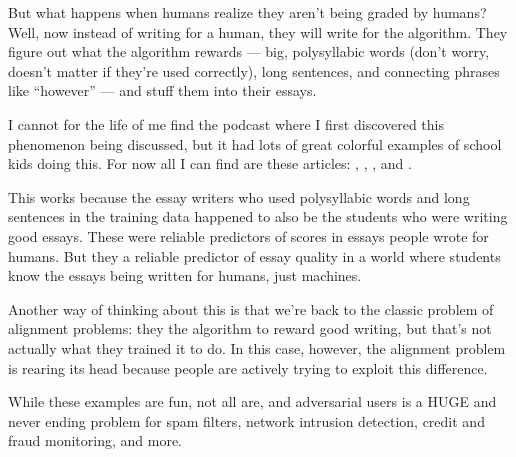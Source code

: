 \documentclass[letterpaper,10pt,english]{jupyterBook}
\begin{document}
\sphinxAtStartPar
But what happens when humans realize they aren’t being graded by humans? Well, now instead of writing for a human, they will write for the algorithm. They figure out what the algorithm rewards — big, polysyllabic words (don’t worry, doesn’t matter if they’re used correctly), long sentences, and connecting phrases like “however” — and stuff them into their essays.%
\begin{footnote}[1]\sphinxAtStartFootnote
I cannot for the life of me find the podcast where I first discovered this phenomenon being discussed, but it had lots of great colorful examples of school kids doing this. For now all I can find are these articles: , , ,  and .
%
\end{footnote}

\sphinxAtStartPar
This works because the essay writers who used polysyllabic words and long sentences in the training data happened to also be the students who were writing good essays. These were reliable predictors of scores in essays people wrote for humans. But they  a reliable predictor of essay quality in a world where students know the essays  being written for humans, just machines.

\sphinxAtStartPar
Another way of thinking about this is that we’re back to the classic problem of alignment problems: they  the algorithm to reward good writing, but that’s not actually what they trained it to do. In this case, however, the alignment problem is rearing its head because people are actively trying to exploit this difference.

\sphinxAtStartPar
While these examples are fun, not all are, and adversarial users is a HUGE and never ending problem for spam filters, network intrusion detection, credit and fraud monitoring, and more.
\end{document}
